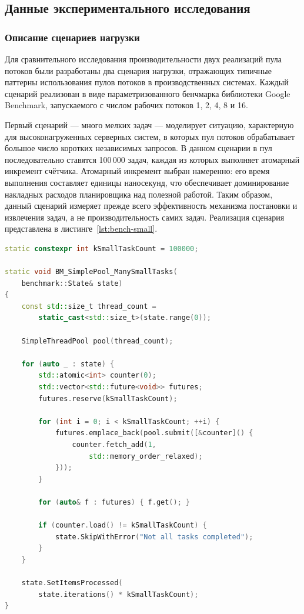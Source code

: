 \subsection{Данные экспериментального исследования}

\subsubsection{Описание сценариев нагрузки}

Для сравнительного исследования производительности двух реализаций
пула потоков были разработаны два сценария нагрузки, отражающих
типичные паттерны использования пулов потоков в производственных
системах. Каждый сценарий реализован в виде параметризованного
бенчмарка библиотеки Google Benchmark, запускаемого с числом
рабочих потоков 1, 2, 4, 8 и 16.

Первый сценарий --- много мелких задач --- моделирует ситуацию,
характерную для высоконагруженных серверных систем, в которых
пул потоков обрабатывает большое число коротких независимых
запросов. В данном сценарии в пул последовательно ставятся
100\,000 задач, каждая из которых выполняет атомарный инкремент
счётчика. Атомарный инкремент выбран намеренно: его время
выполнения составляет единицы наносекунд, что обеспечивает
доминирование накладных расходов планировщика над полезной
работой. Таким образом, данный сценарий измеряет прежде всего
эффективность механизма постановки и извлечения задач, а не
производительность самих задач. Реализация сценария представлена
в листинге~\ref{lst:bench-small}.

\begin{lstlisting}[language=C++,
                   caption={Сценарий 1: много мелких задач},
                   label={lst:bench-small}]
static constexpr int kSmallTaskCount = 100000;

static void BM_SimplePool_ManySmallTasks(
    benchmark::State& state)
{
    const std::size_t thread_count =
        static_cast<std::size_t>(state.range(0));

    SimpleThreadPool pool(thread_count);

    for (auto _ : state) {
        std::atomic<int> counter(0);
        std::vector<std::future<void>> futures;
        futures.reserve(kSmallTaskCount);

        for (int i = 0; i < kSmallTaskCount; ++i) {
            futures.emplace_back(pool.submit([&counter]() {
                counter.fetch_add(1,
                    std::memory_order_relaxed);
            }));
        }

        for (auto& f : futures) { f.get(); }

        if (counter.load() != kSmallTaskCount) {
            state.SkipWithError("Not all tasks completed");
        }
    }

    state.SetItemsProcessed(
        state.iterations() * kSmallTaskCount);
}
\end{lstlisting}

